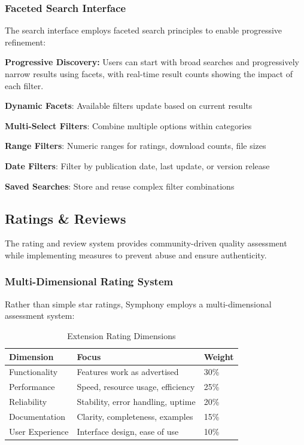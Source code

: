 \subsubsection{Faceted Search Interface}
\label{subsubsec:faceted-search-interface}

The search interface employs faceted search principles to enable progressive refinement:

\begin{successbox}
\textbf{Progressive Discovery:} Users can start with broad searches and progressively narrow results using facets, with real-time result counts showing the impact of each filter.
\end{successbox}

\begin{compactlist}
\item \textbf{Dynamic Facets}: Available filters update based on current results
\item \textbf{Multi-Select Filters}: Combine multiple options within categories
\item \textbf{Range Filters}: Numeric ranges for ratings, download counts, file sizes
\item \textbf{Date Filters}: Filter by publication date, last update, or version release
\item \textbf{Saved Searches}: Store and reuse complex filter combinations
\end{compactlist}

\subsection{Ratings \& Reviews}
\label{subsec:ratings-reviews}

The rating and review system provides community-driven quality assessment while implementing measures to prevent abuse and ensure authenticity.

\subsubsection{Multi-Dimensional Rating System}
\label{subsubsec:multi-dimensional-rating-system}

Rather than simple star ratings, Symphony employs a multi-dimensional assessment system:

\begin{table}[h]
\centering
\caption{Extension Rating Dimensions}
\label{tab:rating-dimensions}
\begin{tabular}{@{}lll@{}}
\toprule
\textbf{Dimension} & \textbf{Focus} & \textbf{Weight} \\
\midrule
Functionality & Features work as advertised & 30\% \\
Performance & Speed, resource usage, efficiency & 25\% \\
Reliability & Stability, error handling, uptime & 20\% \\
Documentation & Clarity, completeness, examples & 15\% \\
User Experience & Interface design, ease of use & 10\% \\
\bottomrule
\end{tabular}
\end{table}

